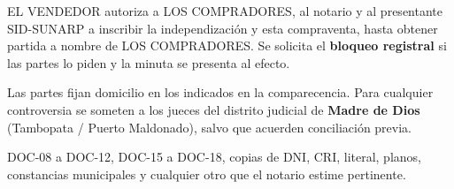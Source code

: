\documentclass[12pt,a4paper]{article}
\begin{document}
EL VENDEDOR autoriza a LOS COMPRADORES, al notario y al presentante SID-SUNARP a inscribir la independización y esta compraventa, hasta obtener partida a nombre de LOS COMPRADORES. Se solicita el \textbf{bloqueo registral} si las partes lo piden y la minuta se presenta al efecto.

Las partes fijan domicilio en los indicados en la comparecencia. Para cualquier controversia se someten a los jueces del distrito judicial de \textbf{Madre de Dios} (Tambopata / Puerto Maldonado), salvo que acuerden conciliación previa.

DOC-08 a DOC-12, DOC-15 a DOC-18, copias de DNI, CRI, literal, planos, constancias municipales y cualquier otro que el notario estime pertinente.

\CierreMinuta
\LugarFecha

\vspace{0.15em}

\vspace{0.7em}
\noindent
{}
\end{document}
